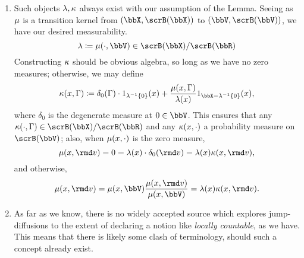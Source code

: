 \begin{remark}
  \label{remark:countable}
  \begin{enumerate}[label=(\alph*)]
    \item
      Such objects $\lambda, \kappa$ always exist with our assumption of the Lemma.
      Seeing as $\mu$ is a transition kernel from $(\stateSpace, \scrB(\stateSpace))$ to $(\vecSpace, \scrB(\vecSpace))$, we have our desired measurability.
      \[
        \affInt \defeq \affJump(\cdot, \vecSpace) \in \scrB(\stateSpace)/\scrB(\bbR)
      \]
      Constructing $\kappa$ should be obvious algebra, so long as we have no zero measures; otherwise, we may define
      \[
        \affDist(\stateVar, \Gamma) \defeq \delta_0(\Gamma) \cdot 1_{\affInt^{-1}\{0\}}(\stateVar) + \frac{\affJump(\stateVar, \Gamma)}{\affInt(\stateVar)} 1_{\stateSpace - \affInt^{-1}\{0\}}(\stateVar),
      \]
      where $\delta_0$ is the degenerate measure at $0 \in \vecSpace$. 
      This ensures that any $\affDist(\cdot, \Gamma) \in \scrB(\stateSpace)/\scrB(\bbR)$ and any $\kappa(x, \cdot)$ a probability measure on $\scrB(\vecSpace)$; also, when $\mu(x, \cdot)$ is the zero measure,
      \[
        \affJump(\stateVar, \rmd\markVar) = 0 = \affInt(\stateVar) \cdot \delta_0(\rmd\markVar) = \affInt(\stateVar) \affDist(\stateVar, \rmd\markVar),
      \]
      and otherwise,
      \[
        \affJump(\stateVar, \rmd\markVar) = \affJump(\stateVar,\vecSpace) \frac{\affJump(\stateVar, \rmd\markVar)}{\affJump(\stateVar, \vecSpace)} = \affInt(\stateVar) \affDist(\stateVar, \rmd\markVar).
      \]
    \item
      As far as we know, there is no widely accepted source which explores jump-diffusions to the extent of declaring a notion like \emph{locally countable}, as we have.
      This means that there is likely some clash of terminology, should such a concept already exist.
  \end{enumerate}
\end{remark}
